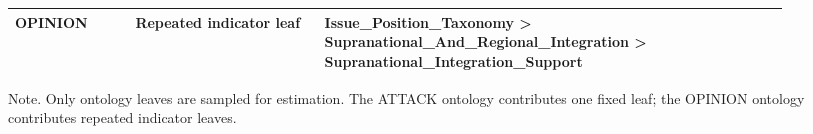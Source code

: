 \begin{table}[htbp]
\begin{threeparttable}
\begin{tabular}{p{0.14\linewidth}p{0.22\linewidth}p{0.54\linewidth}}
OPINION & Repeated indicator leaf & Issue\_Position\_Taxonomy > Supranational\_And\_Regional\_Integration > Supranational\_Integration\_Support \\
\bottomrule
\end{tabular}
\begin{tablenotes}[flushleft]
\footnotesize
\item Note. Only ontology leaves are sampled for estimation. The ATTACK ontology contributes one fixed leaf; the OPINION ontology contributes repeated indicator leaves.
\end{tablenotes}
\end{threeparttable}
\end{table}
